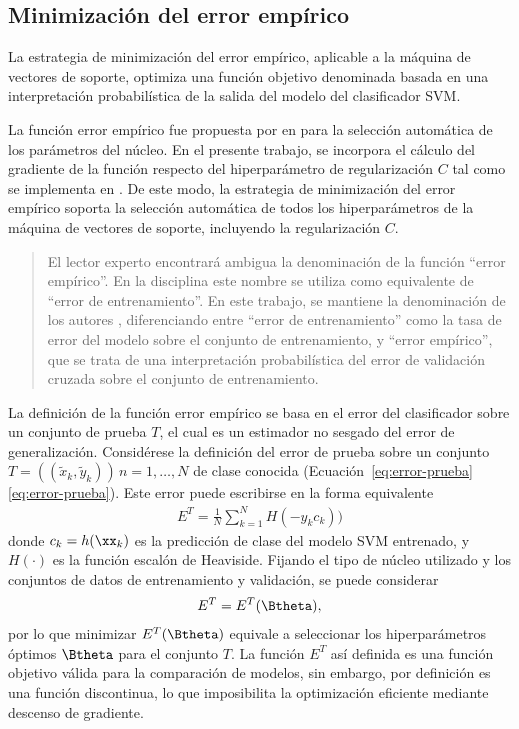 %
%
\subsection{Minimización del error empírico}
%
La estrategia de minimización del error empírico, aplicable a la
máquina de vectores de soporte, optimiza una función objetivo
denominada  basada en una interpretación
probabilística de la salida del modelo del clasificador SVM.

La función error empírico fue propuesta por \citeauthor{ayat} en
\cite{ayat} para la selección automática de los parámetros del núcleo.
En el presente trabajo, se incorpora el cálculo del gradiente de la
función respecto del hiperparámetro de regularización $C$
\cite{keerthi,glasmachers} tal como se implementa en \cite{shark}.  De
este modo, la estrategia de minimización del error empírico soporta la
selección automática de todos los hiperparámetros de la máquina de
vectores de soporte, incluyendo la regularización $C$.
%
\begin{quote}
  El lector experto encontrará ambigua la denominación de la función
  ``error empírico''.  En la disciplina este nombre se utiliza como
  equivalente de ``error de entrenamiento''.  En este trabajo, se
  mantiene la denominación de los autores \cite{ayat}, diferenciando
  entre ``error de entrenamiento'' como la tasa de error del modelo
  sobre el conjunto de entrenamiento, y ``error empírico'', que se
  trata de una interpretación probabilística del error de validación
  cruzada sobre el conjunto de entrenamiento.
\end{quote}
%

La definición de la función error empírico se basa en el error del
clasificador sobre un conjunto de prueba $T$, el cual es un estimador
no sesgado del error de generalización. Considérese la definición del
error de prueba sobre un conjunto
$T=((\tilde{x}_k,\tilde{y}_k))\,n=1,\ldots,N$ de clase conocida
(\iflatexml{}Ecuación~\ref{eq:error-prueba}\else\autoref{eq:error-prueba}\fi).
Este error puede escribirse en la forma equivalente
%
\begin{align}
\label{e3:error-test-alt}
  E^T = \frac{1}{N}\sum_{k=1}^{N} H(-{y}_k {c}_k))
\end{align}
%
donde $c_k=h(\xx_k)$ es la predicción de clase del modelo SVM
entrenado, y $H(\cdot)$ es la función escalón de Heaviside. Fijando el
tipo de núcleo utilizado y los conjuntos de datos de entrenamiento y
validación, se puede considerar
%
\begin{align}
\label{e3:error-test-func-theta}  
  E^T = E^T(\Btheta),
\end{align}
%
por lo que minimizar $E^T(\Btheta)$ equivale a seleccionar los
hiperparámetros óptimos $\Btheta$ para el conjunto $T$.  La función
$E^T$ así definida es una función objetivo válida para la comparación
de modelos, sin embargo, por definición es una función discontinua, lo
que imposibilita la optimización eficiente mediante descenso de
gradiente.

